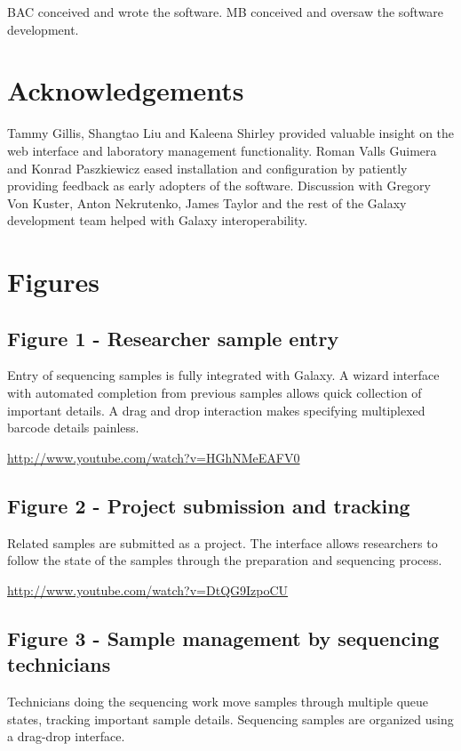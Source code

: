 \documentclass[10pt]{bmc_article}
\newenvironment{bmcformat}{\begin{raggedright}\baselineskip20pt\sloppy\setboolean{publ}{false}}{\end{raggedright}\baselineskip20pt\sloppy}
\begin{document}
\begin{bmcformat}
BAC conceived and wrote the software.
MB conceived and oversaw the software development.

\section*{Acknowledgements}
  Tammy Gillis, Shangtao Liu and Kaleena Shirley provided
  valuable insight on the web interface and laboratory management
  functionality. Roman Valls Guimera and Konrad Paszkiewicz eased
  installation and configuration by patiently providing feedback
  as early adopters of the software. Discussion with Gregory Von
  Kuster, Anton Nekrutenko, James Taylor and the rest of the Galaxy
  development team helped with Galaxy interoperability.

{
   }  %


\section*{Figures}
\subsection*{Figure 1 - Researcher sample entry}
Entry of sequencing samples is fully integrated with Galaxy. A
wizard interface with automated completion from previous samples
allows quick collection of important details. A drag and drop
interaction makes specifying multiplexed barcode details painless.

\url{http://www.youtube.com/watch?v=HGhNMeEAFV0}

\subsection*{Figure 2 - Project submission and tracking}
Related samples are submitted as a project. The interface allows
researchers to follow the state of the samples through the
preparation and sequencing process.

\url{http://www.youtube.com/watch?v=DtQG9IzpoCU}

\subsection*{Figure 3 - Sample management by sequencing technicians}
Technicians doing the sequencing work move samples through multiple
queue states, tracking important sample details. Sequencing samples
are organized using a drag-drop interface.


\end{bmcformat}
\end{document}
